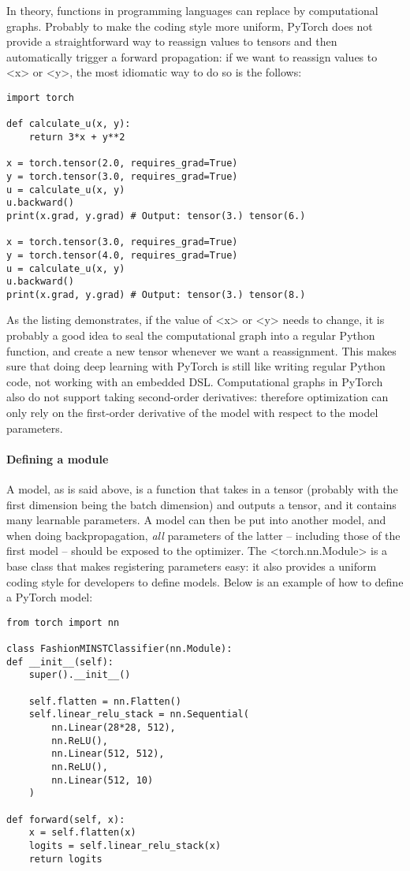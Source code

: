 \documentclass[hyperref, a4paper, 12pt]{report}
\def\texttt#1{<#1>}%
\newcommand{\shortcode}[1]{\texttt{#1}}
\begin{document}
In theory, functions in programming languages can replace by computational graphs.
Probably to make the coding style more uniform,
PyTorch does not provide a straightforward way to reassign values to tensors
and then automatically trigger a forward propagation:
if we want to reassign values to \shortcode{x} or \shortcode{y},
the most idiomatic way to do so is the follows:

\begin{lstlisting}
import torch 

def calculate_u(x, y):
    return 3*x + y**2

x = torch.tensor(2.0, requires_grad=True)
y = torch.tensor(3.0, requires_grad=True)
u = calculate_u(x, y)
u.backward()
print(x.grad, y.grad) # Output: tensor(3.) tensor(6.)

x = torch.tensor(3.0, requires_grad=True)
y = torch.tensor(4.0, requires_grad=True)
u = calculate_u(x, y)
u.backward()
print(x.grad, y.grad) # Output: tensor(3.) tensor(8.)
\end{lstlisting}

As the listing demonstrates, if the value of \shortcode{x} or \shortcode{y} needs to change,
it is probably a good idea to seal the computational graph into a regular Python function,
and create a new tensor whenever we want a reassignment.
This makes sure that doing deep learning with PyTorch is still like writing regular Python code,
not working with an embedded DSL.
Computational graphs in PyTorch also do not support taking second-order derivatives:
therefore optimization can only rely on the first-order derivative of the model with respect to the model parameters.

\paragraph*{Defining a module}
A model, as is said above, is a function that takes in a tensor (probably with the first dimension being the batch dimension) and outputs a tensor,
and it contains many learnable parameters.
A model can then be put into another model,
and when doing backpropagation,
\emph{all} parameters of the latter -- including those of the first model -- 
should be exposed to the optimizer.
The \shortcode{torch.nn.Module} is a base class that makes registering parameters easy:
it also provides a uniform coding style for developers to define models.
Below is an example of how to define a PyTorch model:

\begin{lstlisting}
from torch import nn 

class FashionMINSTClassifier(nn.Module):
def __init__(self):
    super().__init__()
    
    self.flatten = nn.Flatten()
    self.linear_relu_stack = nn.Sequential(
        nn.Linear(28*28, 512),
        nn.ReLU(),
        nn.Linear(512, 512),
        nn.ReLU(),
        nn.Linear(512, 10)
    )
    
def forward(self, x):
    x = self.flatten(x)
    logits = self.linear_relu_stack(x)
    return logits
\end{lstlisting}
\end{document}
